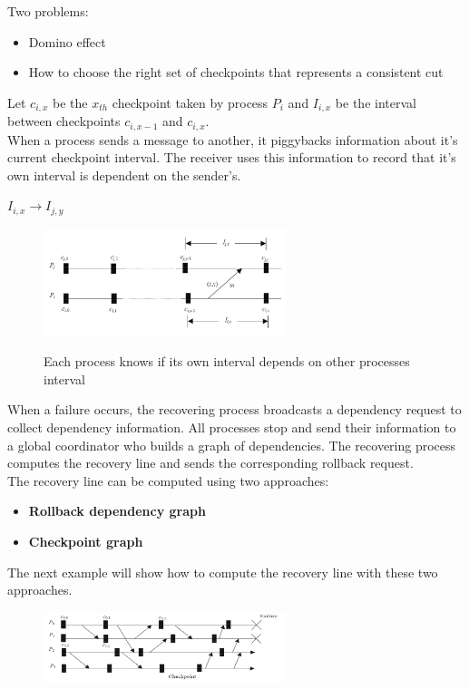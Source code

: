 \documentclass[10pt,a4paper]{article}
\begin{document}
Two problems:
\begin{itemize}
	\item Domino effect
	\item How to choose the right set of checkpoints that represents a consistent cut
\end{itemize}
Let $c_{i,x}$ be the $x_{th}$ checkpoint taken by process $P_i$ and $I_{i,x}$ be the interval between checkpoints $c_{i,x-1}$ and $c_{i,x}$. \\
When a process sends a message to another, it piggybacks information about it's current checkpoint interval. The receiver uses this information to record that it's own interval is dependent on the sender's.
\begin{description}
	\item $I_{i,x} \rightarrow I_{j,y}$
\end{description}
\begin{figure}[h!]
\hfill \includegraphics[width=200pt]{images/independent-checkpoint.png}\hspace*{\fill}
  \label{fig:independent-checkpoint}
  \caption{Each process knows if its own interval depends on other processes interval}
\end{figure}
When a failure occurs, the recovering process broadcasts a dependency request to collect dependency information. All processes stop and send their information to a global coordinator who builds a graph of dependencies. The recovering process computes the recovery line and sends the corresponding rollback request. \\
The recovery line can be computed using two approaches:
\begin{itemize}
	\item \textbf{Rollback dependency graph}
	\item \textbf{Checkpoint graph}
\end{itemize}
\pagebreak
The next example will show how to compute the recovery line with these two approaches.
\begin{figure}[h!]
\hfill \includegraphics[width=200pt]{images/recovery-line.png}\hspace*{\fill}
  \label{fig:recovery-line}
\end{figure}
\end{document}
